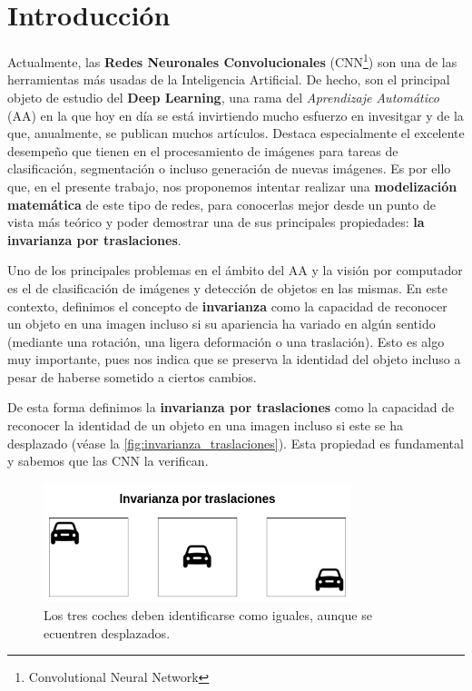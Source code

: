 

\chapter{Introducción}

\noindent Actualmente, las \textbf{Redes Neuronales Convolucionales} (CNN\footnote{Convolutional Neural Network}) son una de las herramientas más usadas de la Inteligencia Artificial. De hecho, son el principal objeto de estudio del \textbf{Deep Learning}, una rama del \textit{Aprendizaje Automático} (AA) en la que hoy en día se está invirtiendo mucho esfuerzo en invesitgar y de la que, anualmente, se publican muchos artículos. Destaca especialmente el excelente desempeño que tienen en el procesamiento de imágenes para tareas de clasificación, segmentación o incluso generación de nuevas imágenes. Es por ello que, en el presente trabajo, nos proponemos intentar realizar una \textbf{modelización matemática} de este tipo de redes, para conocerlas mejor desde un punto de vista más teórico y poder demostrar una de sus principales propiedades: \textbf{la invarianza por traslaciones}.

\medskip

\noindent Uno de los principales problemas en el ámbito del AA y la visión por computador es el de clasificación de imágenes y detección de objetos en las mismas. En este contexto, definimos el concepto de \textbf{invarianza} como la capacidad de reconocer un objeto en una imagen incluso si su apariencia ha variado en algún sentido (mediante una rotación, una  ligera deformación o una traslación). Esto es algo muy importante, pues nos indica que se preserva la identidad del objeto incluso a pesar de haberse sometido a ciertos cambios.

\medskip

\noindent De esta forma definimos la \textbf{invarianza por traslaciones} como la capacidad de reconocer la identidad de un objeto en una imagen incluso si este se ha desplazado (véase la \autoref{fig:invarianza_traslaciones}). Esta propiedad es fundamental y sabemos que las CNN la verifican.

\begin{figure} [!h]
    \centering
    \includegraphics[width=0.8\textwidth]{img/translation_invariance.png}
    \caption{Los tres coches deben identificarse como iguales, aunque se ecuentren desplazados.}
    \label{fig:invarianza_traslaciones}
\end{figure}

